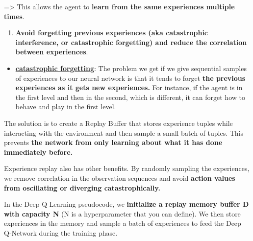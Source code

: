 \documentclass[11pt,a4paper]{article}
\begin{document}

=\textgreater{} This allows the agent to \textbf{learn from the same experiences multiple times}.

\begin{enumerate}
\def\labelenumi{\arabic{enumi}.}
\setcounter{enumi}{1}
\tightlist
\item
  \textbf{Avoid forgetting previous experiences (aka catastrophic interference, or catastrophic forgetting) and reduce the correlation between experiences}.
\end{enumerate}

\begin{itemize}
\tightlist
\item
  \textbf{\href{https://en.wikipedia.org/wiki/Catastrophic_interference}{catastrophic forgetting}}: The problem we get if we give sequential samples of experiences to our neural network is that it tends to forget \textbf{the previous experiences as it gets new experiences.} For instance, if the agent is in the first level and then in the second, which is different, it can forget how to behave and play in the first level.
\end{itemize}

The solution is to create a Replay Buffer that stores experience tuples while interacting with the environment and then sample a small batch of tuples. This prevents \textbf{the network from only learning about what it has done immediately before.}

Experience replay also has other benefits. By randomly sampling the experiences, we remove correlation in the observation sequences and avoid \textbf{action values from oscillating or diverging catastrophically.}

In the Deep Q-Learning pseudocode, we \textbf{initialize a replay memory buffer D with capacity N} (N is a hyperparameter that you can define). We then store experiences in the memory and sample a batch of experiences to feed the Deep Q-Network during the training phase.

\end{document}
